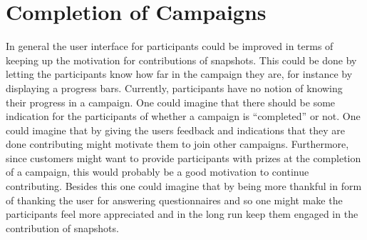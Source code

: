 
\section{Completion of Campaigns}
\label{sec:completion_of_campaigns}

In general the user interface for participants could be improved in terms of keeping up the motivation for contributions of snapshots. This could be done by letting the participants know how far in the campaign they are, for instance by displaying a progress bars. Currently, participants have no notion of knowing their progress in a campaign. One could imagine that there should be some indication for the participants of whether a campaign is  ``completed'' or not. One could imagine that by giving the users feedback and indications that they are done contributing might motivate them to join other campaigns. Furthermore, since customers might want to provide participants with prizes at the completion of a campaign, this would probably be a good motivation to continue contributing. Besides this one could imagine that by being more thankful in form of thanking the user for answering questionnaires and so one might make the participants feel more appreciated and in the long run keep them engaged in the contribution of snapshots.